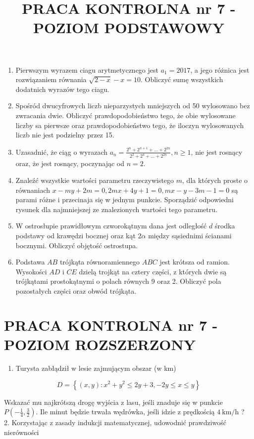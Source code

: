\documentclass[10pt]{article}
\title{PRACA KONTROLNA nr 7 - POZIOM PODSTAWOWY }
\author{}
\date{}
\begin{document}
\maketitle
\begin{enumerate}
  \item Pierwszym wyrazem ciagu arytmetycznego jest $a_{1}=2017$, a jego różnica jest rozwiązaniem równania $\sqrt{2-x}-x=10$. Obliczyć sumę wszystkich dodatnich wyrazów tego ciagu.
  \item Spośród dwucyfrowych liczb nieparzystych mniejszych od 50 wylosowano bez zwracania dwie. Obliczyć prawdopodobieństwo tego, że obie wylosowane liczby sa pierwsze oraz prawdopodobieństwo tego, że iloczyn wylosowanych liczb nie jest podzielny przez 15.
  \item Uzasadnić, że ciąg o wyrazach $a_{n}=\frac{2^{n}+2^{n+1}+\ldots+2^{2 n}}{2^{2}+2^{4}+\ldots+2^{2 n}}, n \geq 1$, nie jest rosnący oraz, że jest rosnący, poczynając od $n=2$.
  \item Znaleźć wszystkie wartości parametru rzeczywistego $m$, dla których proste o równaniach $x-m y+2 m=0,2 m x+4 y+1=0, m x-y-3 m-1=0$ są parami różne i przecinaja się w jednym punkcie. Sporządzić odpowiedni rysunek dla najmniejszej ze znalezionych wartości tego parametru.
  \item W ostrosłupie prawidłowym czworokątnym dana jest odległość $d$ środka podstawy od krawędzi bocznej oraz kąt $2 \alpha$ między sąsiednimi ścianami bocznymi. Obliczyć objętość ostrostupa.
  \item Podstawa $A B$ trójkąta równoramiennego $A B C$ jest krótsza od ramion. Wysokości $A D$ i $C E$ dzielą trojkąt na cztery części, z których dwie są trójkątami prostokątnymi o polach równych 9 oraz 2. Obliczyć pola pozostałych części oraz obwód trójkąta.
\end{enumerate}

\section*{PRACA KONTROLNA nr 7 - POZIOM ROZSZERZONY}
\begin{enumerate}
  \item Turysta zabłądził w lesie zajmującym obszar (w km)
\end{enumerate}

$$
D=\left\{(x, y): x^{2}+y^{2} \leq 2 y+3,-2 y \leq x \leq y\right\}
$$

Wskazać mu najkrótszą drogę wyjścia z lasu, jeśli znaduje się w punkcie $P\left(-\frac{1}{4}, \frac{3}{2}\right)$. Ile minut będzie trwała wędrówka, jeśli idzie z prędkością $4 \mathrm{~km} / \mathrm{h}$ ?\\
2. Korzystając z zasady indukcji matematycznej, udowodnić prawdziwość nierówności
\end{document}
